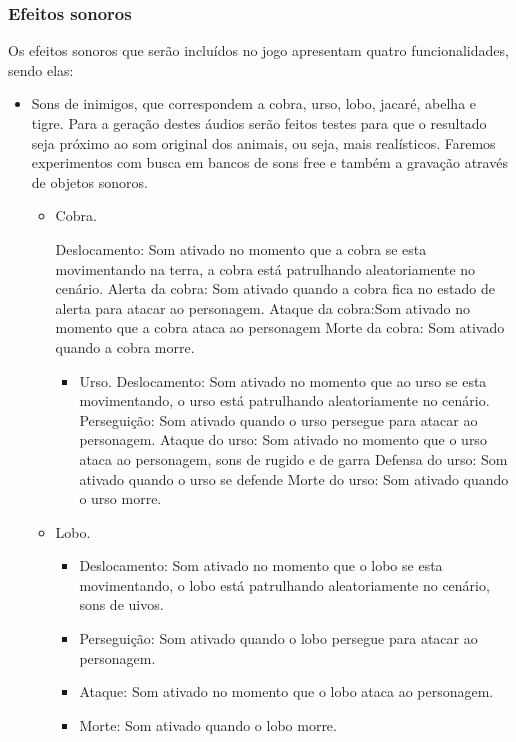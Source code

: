 \subsubsection{Efeitos sonoros}
Os efeitos sonoros que serão incluídos no jogo apresentam quatro
 funcionalidades, sendo elas:
\begin{itemize}
\item Sons de inimigos, que correspondem a cobra, urso, lobo, jacaré, abelha
 e tigre. 
Para a geração destes áudios serão feitos testes para que o resultado 
seja próximo ao som original dos animais, ou seja, mais realísticos. 
Faremos experimentos com busca em bancos de sons free e também a 
gravação através de objetos sonoros. 

\begin{itemize}
\item Cobra.
\begin{itemize}
\subitem Deslocamento: Som ativado no momento que a cobra se esta 
movimentando na terra, a cobra está patrulhando aleatoriamente no cenário.
\subitem Alerta da cobra: Som ativado quando a cobra fica no estado de alerta 
para atacar ao personagem.
\subitem Ataque da cobra:Som ativado no momento que a cobra ataca 
ao personagem 
\subitem Morte da cobra: Som ativado quando a cobra morre. 
\end{itemize}

\begin{itemize}
\item Urso.
\subitem Deslocamento: Som ativado no momento que ao urso se esta movimentando, 
o urso está patrulhando aleatoriamente no cenário.
\subitem Perseguição: Som ativado quando o urso persegue para atacar ao personagem.
\subitem Ataque do urso: Som ativado no momento que o urso ataca ao personagem, 
sons de rugido e de garra
\subitem Defensa do urso: Som ativado quando o urso se defende  
\subitem Morte do urso: Som ativado quando o urso morre.
\end{itemize}

\item Lobo.
\begin{itemize}
\item Deslocamento: Som ativado no momento que o lobo se esta movimentando,
o lobo está patrulhando aleatoriamente no cenário, sons de uivos.
\item Perseguição: Som ativado quando o lobo persegue para atacar ao personagem.
\item Ataque: Som ativado no momento que o lobo ataca ao personagem.
\item Morte: Som ativado quando o lobo morre.
\end{itemize}


\end{itemize}
\end{itemize}
